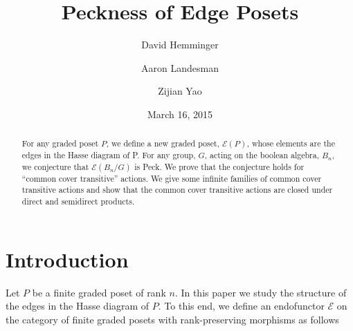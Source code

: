 \documentclass[smallextended]{svjour3}       %
\numberwithin{equation}{section}
\begin{document}
\title{Peckness of Edge Posets}

\author{David Hemminger      \and
        Aaron Landesman 		 \and
        Zijian Yao
}



\date{March 16, 2015}


\maketitle

\begin{abstract}
For any graded poset $P$, we define a new graded poset, $\mathcal E(P)$, whose elements are the edges in the Hasse diagram of P. For any group, $G$, acting on the boolean algebra, $B_n$, we conjecture that $\mathcal E(B_n/G)$ is Peck. We prove that the conjecture holds for ``common cover transitive'' actions. We give some infinite families of common cover transitive actions and show that the common cover transitive actions are closed under direct and semidirect products.

\end{abstract}

\section{Introduction}\label{sec:introduction}


Let $P$ be a finite graded poset of rank $n$.  In this paper we study the structure of the edges in the Hasse diagram of $P$.  To this end, we define an endofunctor $\mathcal{E}$ on the category of finite graded posets with rank-preserving morphisms as follows
\end{document}
